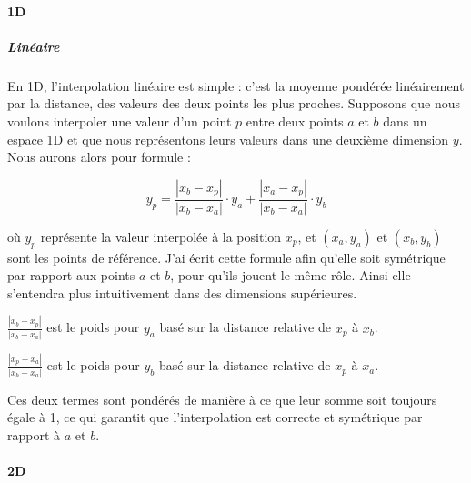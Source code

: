 \paragraph{1D}
\vspace{-0.5cm}
\subparagraph{Linéaire}
En 1D, l'interpolation linéaire est simple \cite{fluidssengineer, palmer2009}: c'est la moyenne pondérée linéairement par la distance, des valeurs des deux points les plus proches.
Supposons que nous voulons interpoler une valeur d'un point \( p \) entre deux points \( a \) et \( b \) dans un espace 1D
et que nous représentons leurs valeurs dans une deuxième dimension \( y \).
Nous aurons alors pour formule :

\begin{equation}
y_p = \frac{|x_b - x_p|}{|x_b - x_a|} \cdot y_a + \frac{|x_a - x_p|}{|x_b - x_a|} \cdot y_b
\end{equation}

où \( y_p \) représente la valeur interpolée à la position \( x_p \), et \((x_a, y_a)\) et \((x_b, y_b)\) sont les points de référence. J'ai écrit cette formule afin qu'elle soit symétrique par rapport aux points \( a \) et \( b \), pour qu'ils jouent le même rôle. Ainsi elle s'entendra plus intuitivement dans des dimensions supérieures.
\vspace{0.5cm}

        \( \frac{|x_b - x_p|}{|x_b - x_a|} \) est le poids pour \( y_a \) basé sur la distance relative de \( x_p \) à \( x_b \).

        \( \frac{|x_p - x_a|}{|x_b - x_a|} \) est le poids pour \( y_b \) basé sur la distance relative de \( x_p \) à \( x_a \).\vspace{0.5cm}

Ces deux termes sont pondérés de manière à ce que leur somme soit toujours égale à 1, ce
qui garantit que l'interpolation est correcte et symétrique par rapport à \( a \) et \( b \).\vspace{0.5cm}

\vspace{-0.5cm}

\paragraph{2D}
\phantom{-}

